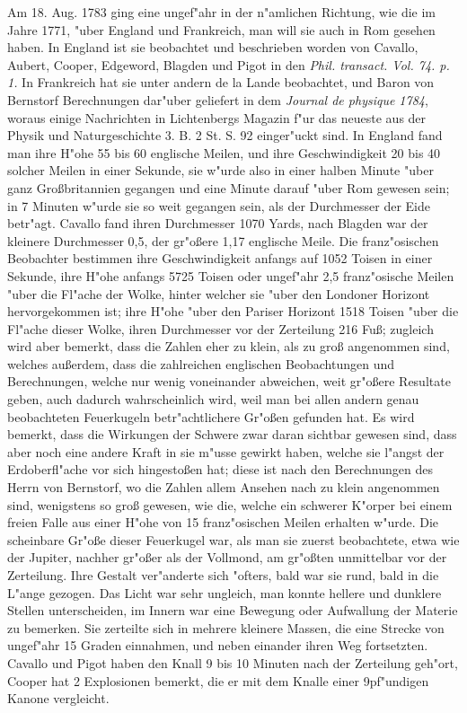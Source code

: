\documentclass[a4paper, 11pt, oneside, polutonikogreek, german]{article}
\begin{document}
Am 18. Aug. 1783 ging eine ungef"ahr in der n"amlichen Richtung, wie die im Jahre 1771, "uber England und Frankreich, man will sie auch in Rom gesehen haben. In England ist sie beobachtet und beschrieben worden von Cavallo, Aubert, Cooper, Edgeword, Blagden und Pigot in den \emph{Phil. transact. Vol. 74. p. 1.} In Frankreich hat sie unter andern de la Lande beobachtet, und Baron von Bernstorf Berechnungen dar"uber geliefert in dem \emph{Journal de physique 1784}, woraus einige Nachrichten in Lichtenbergs Magazin f"ur das neueste aus der Physik und Naturgeschichte 3. B. 2 St. S. 92 einger"uckt sind. In England fand man ihre H"ohe 55 bis 60 englische Meilen, und ihre Geschwindigkeit 20 bis 40 solcher Meilen in einer Sekunde, sie w"urde also in einer halben Minute "uber ganz Großbritannien gegangen und eine Minute darauf "uber Rom gewesen sein; in 7 Minuten w"urde sie so weit gegangen sein, als der Durchmesser der Eide betr"agt. Cavallo fand ihren Durchmesser 1070 Yards, nach Blagden war der kleinere Durchmesser 0,5, der gr"oßere 1,17 englische Meile. Die franz"osischen Beobachter bestimmen ihre Geschwindigkeit anfangs auf 1052 Toisen in einer Sekunde, ihre H"ohe anfangs 5725 Toisen oder ungef"ahr 2,5 franz"osische Meilen "uber die Fl"ache der Wolke, hinter welcher sie "uber den Londoner Horizont hervorgekommen ist; ihre H"ohe "uber den Pariser Horizont 1518 Toisen "uber die Fl"ache dieser Wolke, ihren Durchmesser vor der Zerteilung 216 Fuß; zugleich wird aber bemerkt, dass die Zahlen eher zu klein, als zu groß angenommen sind, welches außerdem, dass die zahlreichen englischen Beobachtungen und Berechnungen, welche nur wenig voneinander abweichen, weit gr"oßere Resultate geben, auch dadurch wahrscheinlich wird, weil man bei allen andern genau beobachteten Feuerkugeln betr"achtlichere Gr"oßen gefunden hat. Es wird bemerkt, dass die Wirkungen der Schwere zwar daran sichtbar gewesen sind, dass aber noch eine andere Kraft in sie m"usse gewirkt haben, welche sie l"angst der Erdoberfl"ache vor sich hingestoßen hat; diese ist nach den Berechnungen des Herrn von Bernstorf, wo die Zahlen allem Ansehen nach zu klein angenommen sind, wenigstens so groß gewesen, wie die, welche ein schwerer K"orper bei einem freien Falle aus einer H"ohe von 15 franz"osischen Meilen erhalten w"urde. Die scheinbare Gr"oße dieser Feuerkugel war, als man sie zuerst beobachtete, etwa wie der Jupiter, nachher gr"oßer als der Vollmond, am gr"oßten unmittelbar vor der Zerteilung. Ihre Gestalt ver"anderte sich "ofters, bald war sie rund, bald in die L"ange gezogen. Das Licht war sehr ungleich, man konnte hellere und dunklere Stellen unterscheiden, im Innern war eine Bewegung oder Aufwallung der Materie zu bemerken. Sie zerteilte sich in mehrere kleinere Massen, die eine Strecke von ungef"ahr 15 Graden einnahmen, und neben einander ihren Weg fortsetzten. Cavallo und Pigot haben den Knall 9 bis 10 Minuten nach der Zerteilung geh"ort, Cooper hat 2 Explosionen bemerkt, die er mit dem Knalle einer 9pf"undigen Kanone vergleicht.
\end{document}
